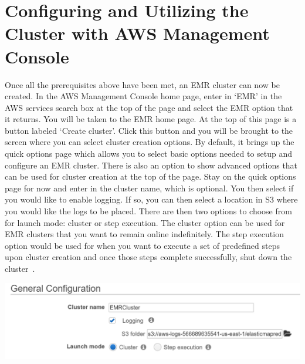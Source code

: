 \section{Configuring and Utilizing the Cluster with AWS Management Console}

Once all the prerequisites above have been met, an EMR cluster can now be 
created. In the AWS Management Console home page, enter in `EMR' in the AWS 
services search box at the top of the page and select the EMR option that it 
returns. You will be taken to the EMR home page. At the top of this page is 
a button labeled `Create cluster'. Click this button and you will be brought 
to the screen where you can select cluster creation options. By default, it 
brings up the quick options page which allows you to select basic options 
needed to setup and configure an EMR cluster. There is also an option to show 
advanced options that can be used for cluster creation at the top of the page. 
Stay on the quick options page for now and enter in the cluster name, which is 
optional. You then select if you would like to enable logging. If so, you can then 
select a location in S3 where you would like the logs to be placed. There are then 
two options to choose from for launch mode: cluster or step execution. The 
cluster option can be used for EMR clusters that you want to remain online 
indefinitely. The step execution option would be used for when you want to 
execute a set of predefined steps upon cluster creation and once those steps 
complete successfully, shut down the cluster~\cite{hid-sp18-521-emrlaunch}. 

\begin{center}
\includegraphics[width=\columnwidth]{images/emr_gen_config.png}
\end{center}


